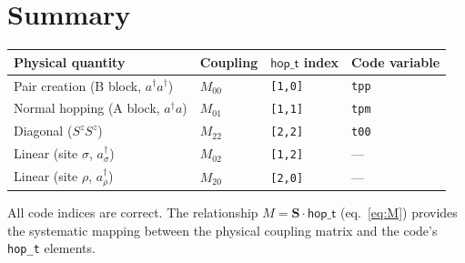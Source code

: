 \documentclass[11pt]{article}
\newcommand{\hop}{\mathsf{hop\_t}}
\newcommand{\dg}{^\dagger}
\begin{document}
\section{Summary}

\begin{center}
\begin{tabular}{llll}
\toprule
Physical quantity & Coupling & $\hop$ index & Code variable \\
\midrule
Pair creation (B block, $a\dg a\dg$)
  & $M_{00}$ & \texttt{[1,0]} & \texttt{tpp} \\
Normal hopping (A block, $a\dg a$)
  & $M_{01}$ & \texttt{[1,1]} & \texttt{tpm} \\
Diagonal ($S^z S^z$)
  & $M_{22}$ & \texttt{[2,2]} & \texttt{t00} \\
Linear (site $\sigma$, $a\dg_\sigma$)
  & $M_{02}$ & \texttt{[1,2]} & --- \\
Linear (site $\rho$, $a\dg_\rho$)
  & $M_{20}$ & \texttt{[2,0]} & --- \\
\bottomrule
\end{tabular}
\end{center}

All code indices are correct.  The relationship $M = \mathbf{S}\cdot\hop$
(eq.~\eqref{eq:M}) provides the systematic mapping between the physical
coupling matrix and the code's \texttt{hop\_t} elements.
\end{document}
